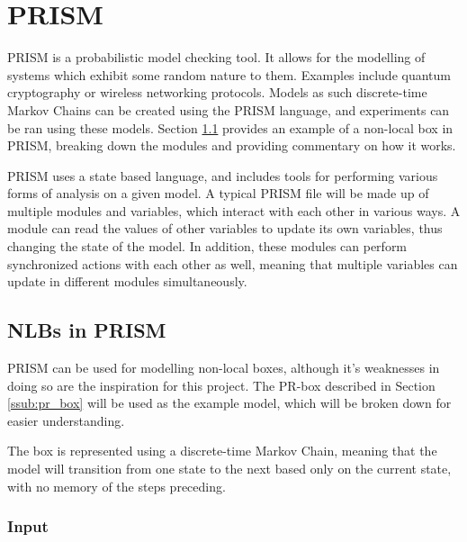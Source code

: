 \documentclass[report.tex]{subfiles}
\begin{document}

\section{PRISM} %
\label{sec:prism}
PRISM \cite{KNP11} is a probabilistic model checking tool. It allows for
the modelling of systems which exhibit some random nature to them. Examples
include quantum cryptography or wireless networking protocols. Models as such
discrete-time Markov Chains can be created using the PRISM language, and
experiments can be ran using these models. Section \ref{sub:nlbs_in_prism}
provides an example of a non-local box in PRISM, breaking down the modules and
providing commentary on how it works.

PRISM uses a state based language, and includes tools for performing various
forms of analysis on a given model. A typical PRISM file will be made up of
multiple modules and variables, which interact with each other in various ways.
A module can read the values of other variables to update its own variables,
thus changing the state of the model. In addition, these modules can perform
synchronized actions with each other as well, meaning that multiple variables
can update in different modules simultaneously.

\subsection{NLBs in PRISM} %
\label{sub:nlbs_in_prism}
PRISM can be used for modelling non-local boxes, although it's weaknesses in 
doing so are the inspiration for this project. The PR-box described in
Section \ref{ssub:pr_box} will be used as the example model, which will be
broken down for easier understanding.

The box is represented using a discrete-time Markov Chain, meaning that the 
model will transition from one state to the next based only on the current
state, with no memory of the steps preceding.

\subsubsection{Input} %
\label{ssub:input}
 
\end{document}
